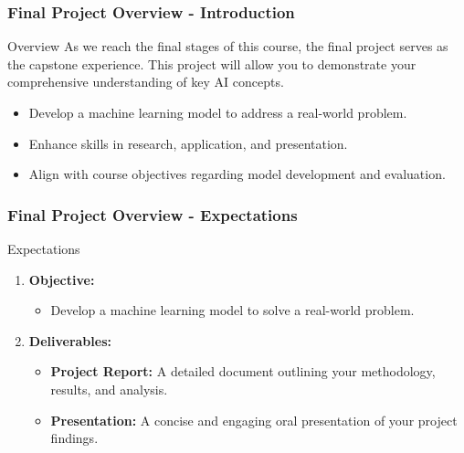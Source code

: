 \documentclass[aspectratio=169]{beamer}
\begin{document}
\begin{frame}[fragile]
    \frametitle{Final Project Overview - Introduction}
    \begin{block}{Overview}
        As we reach the final stages of this course, the final project serves as the capstone experience. This project will allow you to demonstrate your comprehensive understanding of key AI concepts.
    \end{block}
    
    \begin{itemize}
        \item Develop a machine learning model to address a real-world problem.
        \item Enhance skills in research, application, and presentation.
        \item Align with course objectives regarding model development and evaluation.
    \end{itemize}
\end{frame}

\begin{frame}[fragile]
    \frametitle{Final Project Overview - Expectations}
    \begin{block}{Expectations}
        \begin{enumerate}
            \item \textbf{Objective:} 
            \begin{itemize}
                \item Develop a machine learning model to solve a real-world problem.
            \end{itemize}
            \item \textbf{Deliverables:} 
            \begin{itemize}
                \item \textbf{Project Report:} A detailed document outlining your methodology, results, and analysis.
                \item \textbf{Presentation:} A concise and engaging oral presentation of your project findings.
            \end{itemize}
        \end{enumerate}
    \end{block}
\end{frame}
\end{document}
